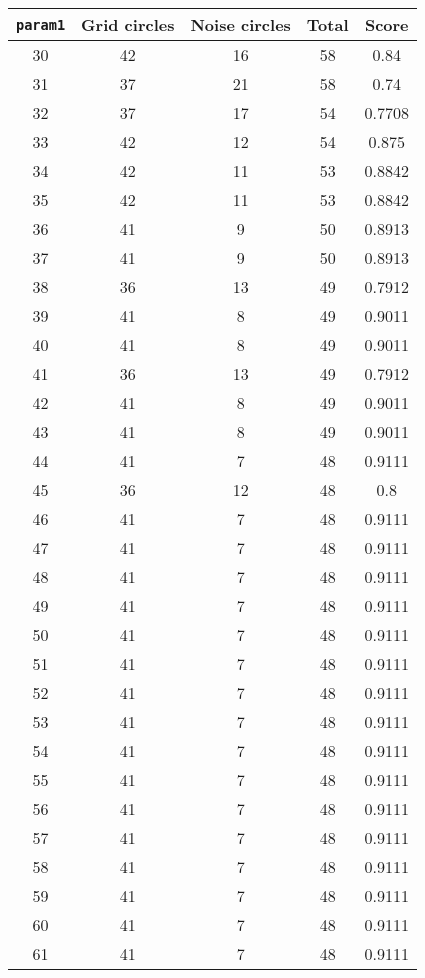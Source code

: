 \documentclass[letterpaper, 12pt]{article}
\begin{document}
\begin{longtable}{|c|c|c|c|c|}
\hline
\textbf{\texttt{param1}} & \textbf{Grid circles} & \textbf{Noise circles} & \textbf{Total} & \textbf{Score} \\
\hline
30 & 42 & 16 & 58 & 0.84 \\
\hline
31 & 37 & 21 & 58 & 0.74 \\
\hline
32 & 37 & 17 & 54 & 0.7708 \\
\hline
33 & 42 & 12 & 54 & 0.875 \\
\hline
34 & 42 & 11 & 53 & 0.8842 \\
\hline
35 & 42 & 11 & 53 & 0.8842 \\
\hline
36 & 41 & 9 & 50 & 0.8913 \\
\hline
37 & 41 & 9 & 50 & 0.8913 \\
\hline
38 & 36 & 13 & 49 & 0.7912 \\
\hline
39 & 41 & 8 & 49 & 0.9011 \\
\hline
40 & 41 & 8 & 49 & 0.9011 \\
\hline
41 & 36 & 13 & 49 & 0.7912 \\
\hline
42 & 41 & 8 & 49 & 0.9011 \\
\hline
43 & 41 & 8 & 49 & 0.9011 \\
\hline
44 & 41 & 7 & 48 & 0.9111 \\
\hline
45 & 36 & 12 & 48 & 0.8 \\
\hline
46 & 41 & 7 & 48 & 0.9111 \\
\hline
47 & 41 & 7 & 48 & 0.9111 \\
\hline
48 & 41 & 7 & 48 & 0.9111 \\
\hline
49 & 41 & 7 & 48 & 0.9111 \\
\hline
50 & 41 & 7 & 48 & 0.9111 \\
\hline
51 & 41 & 7 & 48 & 0.9111 \\
\hline
52 & 41 & 7 & 48 & 0.9111 \\
\hline
53 & 41 & 7 & 48 & 0.9111 \\
\hline
54 & 41 & 7 & 48 & 0.9111 \\
\hline
55 & 41 & 7 & 48 & 0.9111 \\
\hline
56 & 41 & 7 & 48 & 0.9111 \\
\hline
57 & 41 & 7 & 48 & 0.9111 \\
\hline
58 & 41 & 7 & 48 & 0.9111 \\
\hline
59 & 41 & 7 & 48 & 0.9111 \\
\hline
60 & 41 & 7 & 48 & 0.9111 \\
\hline
61 & 41 & 7 & 48 & 0.9111 \\

\end{longtable}
\end{document}
